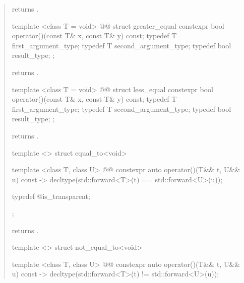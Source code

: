 \begin{quote}
\begin{itemdescr}
\pnum
{} returns .
\end{itemdescr}

%
\begin{itemdecl}
template <class T = void>
  @@
struct greater_equal {
  constexpr bool operator()(const T& x, const T& y) const;
  typedef T first_argument_type;
  typedef T second_argument_type;
  typedef bool result_type;
};
\end{itemdecl}

\begin{itemdescr}
\pnum
{} returns .
\end{itemdescr}

%
\begin{itemdecl}
template <class T = void>
  @@
struct less_equal {
  constexpr bool operator()(const T& x, const T& y) const;
  typedef T first_argument_type;
  typedef T second_argument_type;
  typedef bool result_type;
};
\end{itemdecl}

\begin{itemdescr}
\pnum
{} returns .
\end{itemdescr}

%
\begin{itemdecl}
template <> struct equal_to<void> {
  template <class T, class U>
    @@
  constexpr auto operator()(T&& t, U&& u) const
    -> decltype(std::forward<T>(t) == std::forward<U>(u));

  typedef @\unspec@ is_transparent;
};
\end{itemdecl}

\begin{itemdescr}
\pnum
{} returns .
\end{itemdescr}

%
\begin{itemdecl}
template <> struct not_equal_to<void> {
  template <class T, class U>
    @@
  constexpr auto operator()(T&& t, U&& u) const
    -> decltype(std::forward<T>(t) != std::forward<U>(u));

}
\end{itemdecl}
\end{quote}
